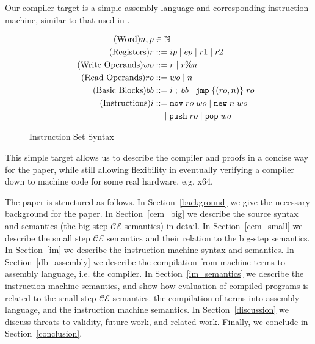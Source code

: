 Our compiler target is a simple assembly language and corresponding instruction
machine, similar to that used in \cite{chlipala_verified}. 
\begin{figure}
\begin{align*}
  \tag{Word}   n, p &\in \mathbb{N} \\
  \tag{Registers} r &::= ip \; | \; ep \; | \; r1 \; | \; r2  \\
  \tag{Write Operands}  wo &::= r \; | \; r\%n \\
  \tag{Read Operands}  ro &::= wo \; | \; n \\
  \tag{Basic Blocks} bb &::= i \; ; \; bb \; 
                       | \; \texttt{jmp} \; \{(ro, n)\} \; ro \;  \\
  \tag{Instructions} i &::= \texttt{mov} \; ro \; wo \; 
                       | \; \texttt{new} \; n \; wo \; \\
  \notag   & \quad \;  | \; \texttt{push} \; ro \; 
                       | \; \texttt{pop} \; wo 
\end{align*}
\label{fig:im_syntax}
\caption{Instruction Set Syntax}
\end{figure}
This simple target allows us to describe the compiler and proofs in a concise
way for the paper, while still allowing flexibility in eventually verifying a
compiler down to machine code for some real hardware, e.g. x64.

The paper is structured as follows. In Section~\ref{background} we give the
necessary background for the paper. In Section~\ref{cem_big} we describe the
source syntax and semantics (the big-step $\mathcal{CE}$ semantics) in detail.
In Section~\ref{cem_small} we describe the small step $\mathcal{CE}$ semantics
and their relation to the big-step semantics.  In Section~\ref{im} we describe
the instruction machine syntax and semantics. In Section~\ref{db_assembly} we
describe the compilation from machine terms to assembly language, i.e. the
compiler. In Section~\ref{im_semantics} we describe the instruction machine
semantics, and show how evaluation of compiled programs is related to the small
step $\mathcal{CE}$ semantics. the compilation of terms into assembly language,
and the instruction machine semantics. In Section~\ref{discussion} we discuss
threats to validity, future work, and related work. Finally, we conclude in
Section~\ref{conclusion}.


